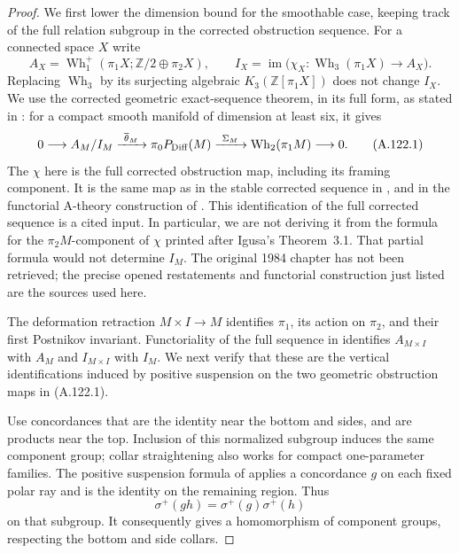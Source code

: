\begin{proof}
We first lower the dimension bound for the smoothable case, keeping
track of the full relation subgroup in the corrected obstruction
sequence. For a connected space $X$ write
\[
 A_X=\operatorname{Wh}_1^+(\pi_1X;\mathbb Z/2\oplus\pi_2X),
 \qquad
 I_X=\operatorname{im}\bigl(\chi_X:
       \operatorname{Wh}_3(\pi_1X)\longrightarrow A_X\bigr).
\]
Replacing $\operatorname{Wh}_3$ by its surjecting algebraic
$K_3(\mathbb Z[\pi_1X])$ does not change $I_X$.
We use the corrected geometric exact-sequence theorem, in its full
form, as stated in
\cite[Theorem~3.1, p.~6]{Igusa2021Dimension3}: for a compact smooth
manifold of dimension at least six, it gives
\[
 0\longrightarrow A_M/I_M\xrightarrow{\ \overline\theta_M\ }
 \pi_0P_{\rm Diff}(M)\xrightarrow{\ \Sigma_M\ }
 \operatorname{Wh}_2(\pi_1M)\longrightarrow0.             \tag{A.122.1}
\]
The $\chi$ here is the full corrected obstruction map, including
its framing component. It is the same map as in the stable
corrected sequence in \cite[Introduction, (0.2), p.~2]
{Igusa2021SecondObstructionI}, and in the functorial A-theory
construction of \cite[Section~2, especially Corollary~2.7, p.~250]
{Jahren2010}. This identification of the full corrected sequence is
a cited input. In particular, we are not deriving it from the
formula for the $\pi_2M$-component of $\chi$ printed after Igusa's
Theorem~3.1. That partial formula would not determine $I_M$.
The original 1984 chapter \cite{Igusa1984Postnikov} has not been
retrieved; the precise opened restatements and functorial
construction just listed are the sources used here.

The deformation retraction $M\times I\longrightarrow M$
identifies $\pi_1$, its action on $\pi_2$, and their first Postnikov
invariant. Functoriality of the full sequence in
\cite[Corollary~2.7]{Jahren2010} identifies $A_{M\times I}$ with
$A_M$ and $I_{M\times I}$ with $I_M$. We next verify that these
are the vertical identifications induced by positive suspension on
the two geometric obstruction maps in (A.122.1).

Use concordances that are the identity near the bottom and sides,
and are products near the top. Inclusion of this normalized
subgroup induces the same component group; collar straightening
also works for compact one-parameter families. The positive
suspension formula of
\cite[Section~4.1, p.~8]{Igusa2021Dimension3} applies a
concordance $g$ on each fixed polar ray and is the identity on the
remaining region. Thus
\[
                     \sigma^+(gh)=\sigma^+(g)\sigma^+(h)
\]
on that subgroup. It consequently gives a homomorphism of
component groups, respecting the bottom and side collars.


\end{proof}
